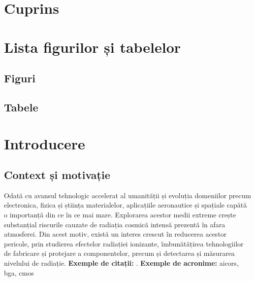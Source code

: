 \documentclass[12pt,a4paper]{report}
\begin{document}
% 

\chapter*{Cuprins}
\vspace{-8em}
\tableofcontents
\newpage

\chapter*{Lista figurilor și tabelelor}

\section*{Figuri}
\vspace{-6em}
\listoffigures
\newpage

\section*{Tabele}
\vspace{-6em}
\listoftables
\newpage

\begingroup
\small
{}
\printglossary[type=acronym, style=list, nonumberlist, nogroupskip,title=Listă de acronime]
\endgroup
{}
\newpage

\chapter{Introducere}
\section{Context și motivație}
Odată cu avansul tehnologic accelerat al umanității și evoluția domeniilor precum electronica, fizica și știința materialelor, aplicațiile aeronautice și spațiale capătă o importanță din ce în ce mai mare. Explorarea acestor medii extreme crește substanțial riscurile cauzate de radiația cosmică intensă prezentă în afara atmosferei. Din acest motiv, există un interes crescut în reducerea acestor pericole, prin studierea efectelor radiației ionizante, îmbunătățirea tehnologiilor de fabricare și protejare a componentelor, precum și detectarea și măsurarea nivelului de radiație. \textbf{Exemple de citații:} \cite{radiation_sensor_types} \cite{gaseours_detectors}. \textbf{Exemple de acronime:} \gls{aicors}, \gls{bga}, \gls{cmos}
\end{document}

